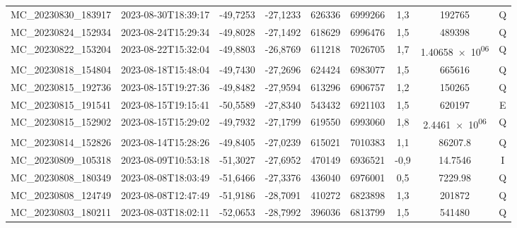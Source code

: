 \begin{center}
\begin{longtable}{ccccS[table-format=6.0]S[table-format=7.0]ccc}
\endlastfoot
MC\_20230830\_183917 & 2023-08-30T18:39:17 & -49,7253 & -27,1233 & 626336 & 6999266 & 1,3 & \num[round-precision=3,round-mode=figures,scientific-notation=true]{192765} & Q \\
MC\_20230824\_152934 & 2023-08-24T15:29:34 & -49,8028 & -27,1492 & 618629 & 6996476 & 1,5 & \num[round-precision=3,round-mode=figures,scientific-notation=true]{489398} & Q \\
MC\_20230822\_153204 & 2023-08-22T15:32:04 & -49,8803 & -26,8769 & 611218 & 7026705 & 1,7 & \num[round-precision=3,round-mode=figures,scientific-notation=true]{1.40658e+06} & Q \\
MC\_20230818\_154804 & 2023-08-18T15:48:04 & -49,7430 & -27,2696 & 624424 & 6983077 & 1,5 & \num[round-precision=3,round-mode=figures,scientific-notation=true]{665616} & Q \\
MC\_20230815\_192736 & 2023-08-15T19:27:36 & -49,8482 & -27,9594 & 613296 & 6906757 & 1,2 & \num[round-precision=3,round-mode=figures,scientific-notation=true]{150265} & Q \\
MC\_20230815\_191541 & 2023-08-15T19:15:41 & -50,5589 & -27,8340 & 543432 & 6921103 & 1,5 & \num[round-precision=3,round-mode=figures,scientific-notation=true]{620197} & E \\
MC\_20230815\_152902 & 2023-08-15T15:29:02 & -49,7932 & -27,1799 & 619550 & 6993060 & 1,8 & \num[round-precision=3,round-mode=figures,scientific-notation=true]{2.4461e+06} & Q \\
MC\_20230814\_152826 & 2023-08-14T15:28:26 & -49,8405 & -27,0239 & 615021 & 7010383 & 1,1 & \num[round-precision=3,round-mode=figures,scientific-notation=true]{86207.8} & Q \\
MC\_20230809\_105318 & 2023-08-09T10:53:18 & -51,3027 & -27,6952 & 470149 & 6936521 & -0,9 & \num[round-precision=3,round-mode=figures,scientific-notation=true]{14.7546} & I \\
MC\_20230808\_180349 & 2023-08-08T18:03:49 & -51,6466 & -27,3376 & 436040 & 6976001 & 0,5 & \num[round-precision=3,round-mode=figures,scientific-notation=true]{7229.98} & Q \\
MC\_20230808\_124749 & 2023-08-08T12:47:49 & -51,9186 & -28,7091 & 410272 & 6823898 & 1,3 & \num[round-precision=3,round-mode=figures,scientific-notation=true]{201872} & Q \\
MC\_20230803\_180211 & 2023-08-03T18:02:11 & -52,0653 & -28,7992 & 396036 & 6813799 & 1,5 & \num[round-precision=3,round-mode=figures,scientific-notation=true]{541480} & Q \\

\end{longtable}
\end{center}
